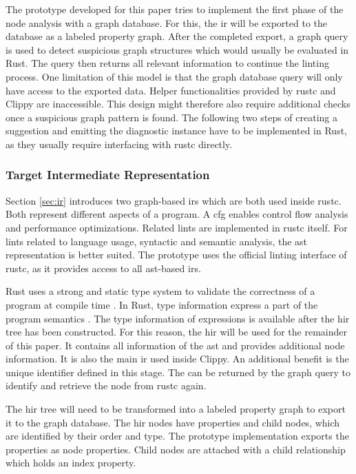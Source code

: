 The prototype developed for this paper tries to implement the first phase of the node analysis with a graph database. For this, the \acrshort{ir} will be exported to the database as a labeled property graph. After the completed export, a graph query is used to detect suspicious graph structures which would usually be evaluated in Rust. The query then returns all relevant information to continue the linting process. One limitation of this model is that the graph database query will only have access to the exported data. Helper functionalities provided by rustc and Clippy are inaccessible. This design might therefore also require additional checks once a suspicious graph pattern is found. The following two steps of creating a suggestion and emitting the diagnostic instance have to be implemented in Rust, as they usually require interfacing with rustc directly.

\subsubsection{Target Intermediate Representation}

Section \ref{sec:ir} introduces two graph-based \acrshort{ir}s which are both used inside rustc. Both represent different aspects of a program. A \acrshort{cfg} enables control flow analysis and performance optimizations. Related lints are implemented in rustc itself. For lints related to language usage, syntactic and semantic analysis, the \acrshort{ast} representation is better suited. The prototype uses the official linting interface of rustc, as it provides access to all \acrshort{ast}-based \acrshort{ir}s. 

Rust uses a strong and static type system to validate the correctness of a program at compile time \cite[p.~9]{jung2021}. In Rust, type information express a part of the program semantics \cite{rustcdev2021.ty-types}. The type information of expressions is available after the \acrshort{hir} tree has been constructed. For this reason, the \acrshort{hir} will be used for the remainder of this paper. It contains all information of the \acrshort{ast} and provides additional node information. It is also the main \acrshort{ir} used inside Clippy. An additional benefit is the unique identifier defined in this stage. The  can be returned by the graph query to identify and retrieve the node from rustc again.

The \acrshort{hir} tree will need to be transformed into a labeled property graph to export it to the graph database. The \acrshort{hir} nodes have properties and child nodes, which are identified by their order and type. The prototype implementation exports the properties as node properties. Child nodes are attached with a child relationship which holds an index property.

